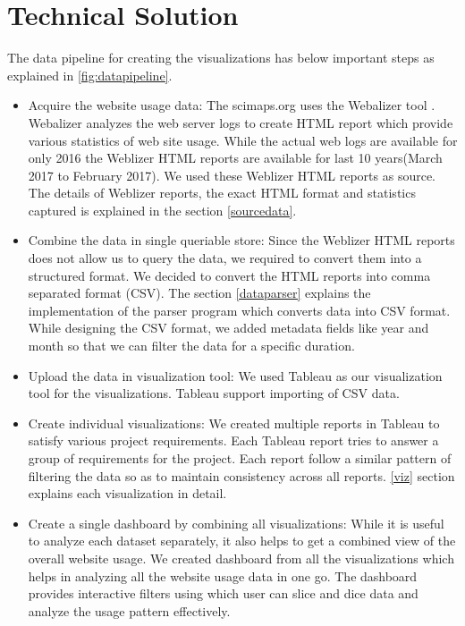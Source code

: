 \section{Technical Solution} \label{techsol}

The data pipeline for creating the visualizations has below important steps
as explained in \ref{fig:datapipeline}.

\begin{itemize}
\item Acquire the website usage data:
The scimaps.org uses the Webalizer tool \cite{weblizer}.
Webalizer
analyzes the web server logs to create HTML report which provide various
statistics of web site usage. While the actual web logs are available for
only 2016 the Weblizer HTML reports are available for last 10 years(March
2017 to February 2017). We used these Weblizer HTML reports as source. The
details of Weblizer reports, the exact HTML format and statistics captured is
 explained in the section \ref{sourcedata}.

\item Combine the data in single queriable store:
Since the Weblizer HTML reports does not allow us to query the data, we
required to convert them into a structured format. We decided to convert the
HTML reports into comma separated format (CSV). The section \ref{dataparser}
explains the implementation of the parser program which converts data into
CSV format. While designing the CSV format, we added metadata fields like
year and month so that we can filter the data for a specific duration.

\item Upload the data in visualization tool:
We used Tableau \cite{tableau} as our visualization tool for the
visualizations. Tableau support importing of CSV data.
\item Create individual visualizations:
We created multiple reports in Tableau to satisfy various project
requirements. Each Tableau report tries to answer a group of requirements for
 the project. Each report follow a similar pattern of filtering the data so
 as to maintain consistency across all reports. \ref{viz} section explains
 each visualization in detail.
\item Create a single dashboard by combining all visualizations:
While it is useful to analyze each dataset separately, it also helps to get a
 combined view of the overall website usage. We created dashboard from all
 the visualizations which helps in analyzing all the website usage data in
 one go. The dashboard provides interactive filters using which user can
 slice and dice data and analyze the usage pattern effectively.
\end{itemize}

